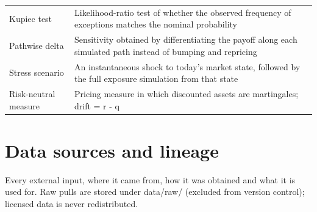 \documentclass[11pt,letterpaper]{article}
\begin{document}
{\begin{longtable}{>{\raggedright\arraybackslash}p{}>{\raggedright\arraybackslash}p{}}
Kupiec test & Likelihood-ratio test of whether the observed frequency of exceptions matches the nominal probability \\
\rowcolor{gray!9}Pathwise delta & Sensitivity obtained by differentiating the payoff along each simulated path instead of bumping and repricing \\
Stress scenario & An instantaneous shock to today's market state, followed by the full exposure simulation from that state \\
\rowcolor{gray!9}Risk-neutral measure & Pricing measure in which discounted assets are martingales; drift = r - q \\
\bottomrule
\end{longtable}}

\section{Data sources and lineage}
Every external input, where it came from, how it was obtained and what it is used for. Raw pulls are stored under data/raw/ (excluded from version control); licensed data is never redistributed.
\end{document}
